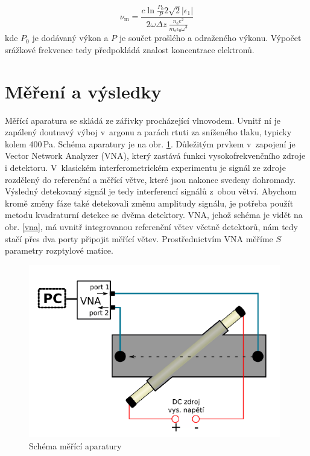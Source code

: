 \documentclass[a4paper,12pt]{article}
\begin{document}
\begin{equation}
	\nu_\text{m} = \frac{c \ln \frac{P_0}{P} 2 \sqrt{2}|\epsilon_1|}{2\omega \Delta z~\frac{n_\text{e} e^2}{m_\text{e} \epsilon_0 \omega^3}}
\end{equation}
kde $P_0$ je dodávaný výkon a $P$ je součet prošlého a odraženého výkonu.
Výpočet srážkové frekvence tedy předpokládá znalost koncentrace elektronů.

\section{Měření a výsledky}
Měřící aparatura se skládá ze zářivky procházející vlnovodem. Uvnitř ní je
zapálený doutnavý výboj v~argonu a parách rtuti 
za sníženého tlaku, typicky kolem 400\,\si{\pascal}. Schéma aparatury je na obr.
\ref{schema}. Důležitým prvkem v~zapojení je Vector Network Analyzer (VNA),
který zastává funkci vysokofrekvenčního zdroje i detektoru.
V~klasickém interferometrickém experimentu je signál ze zdroje rozdělený do
referenční a měřící větve, které jsou nakonec svedeny dohromady. Výsledný 
detekovaný signál je tedy interferencí signálů z~obou větví. Abychom kromě 
změny fáze také detekovali změnu amplitudy signálu, je potřeba použít metodu 
kvadraturní detekce se dvěma detektory. VNA, jehož schéma je vidět na 
obr. \ref{vna}, má uvnitř integrovanou referenční větev včetně detektorů, 
nám tedy stačí přes dva porty připojit měřící větev. Prostřednictvím VNA měříme $S$ parametry rozptylové matice.

\begin{figure}[h]
	\centering
	\includegraphics[width=110mm]{schema.png}
	\caption{Schéma měřící aparatury}
	\label{schema}
\end{figure}
\end{document}
